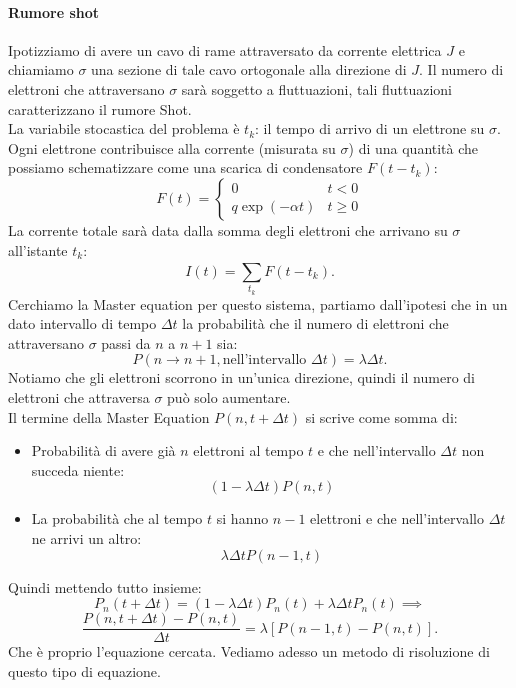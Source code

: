 \paragraph{Rumore shot}%
Ipotizziamo di avere un cavo di rame attraversato da corrente elettrica $J$ e chiamiamo $\sigma$ una sezione di tale cavo ortogonale alla direzione di $J$. Il numero di elettroni che attraversano $\sigma$ sarà soggetto a fluttuazioni, tali fluttuazioni caratterizzano il rumore Shot.\\
La variabile stocastica del problema è $t_k$: il tempo di arrivo di un elettrone su $\sigma$. Ogni elettrone contribuisce alla corrente (misurata su $\sigma$) di una quantità che possiamo schematizzare come una scarica di condensatore $F(t-t_k)$:
\[
    F(t) = \begin{cases}
	0	 			&t<0\\
	q \exp\left(-\alpha t\right) 	&t \ge 0
    \end{cases}
\] 
La corrente totale sarà data dalla somma degli elettroni che arrivano su $\sigma$ all'istante $t_k$:
\[
    I(t) = \sum_{t_k}^{} F(t-t_k) 
.\] 
Cerchiamo la Master equation per questo sistema, partiamo dall'ipotesi che in un dato intervallo di tempo $\Delta t$ la probabilità che il numero di elettroni che attraversano $\sigma$ passi da $n$ a $n+1$ sia:
\[
    P(n\to n+1, \text{nell'intervallo }\Delta  t) = \lambda \Delta t
.\] 
Notiamo che gli elettroni scorrono in un'unica direzione, quindi il numero di elettroni che attraversa $\sigma$ può solo aumentare.\\
Il termine della Master Equation $P(n, t + \Delta t)$ si scrive come somma di:
\begin{itemize}
    \item Probabilità di avere già $n$ elettroni al tempo $t$ e che nell'intervallo $\Delta t$ non succeda niente:
	\[
	    (1-\lambda \Delta t) P(n, t)
	\]
    \item La probabilità che al tempo $t$ si hanno $n-1$ elettroni e che nell'intervallo $\Delta t$ ne arrivi un altro:
	\[
	    \lambda \Delta t P(n-1, t)
	\]
\end{itemize}
Quindi mettendo tutto insieme:
\[
    P_n(t+\Delta  t) = \left(1-\lambda\Delta t\right)P_n(t) + \lambda\Delta t  P_n(t)\implies 
\] 
\[
	\frac{P(n, t+\Delta  t) - P(n,t)}{\Delta t} = \lambda\left[P(n-1,t) -P(n,t)\right] 
.\] 
Che è proprio l'equazione cercata. Vediamo adesso un metodo di risoluzione di questo tipo di equazione.

